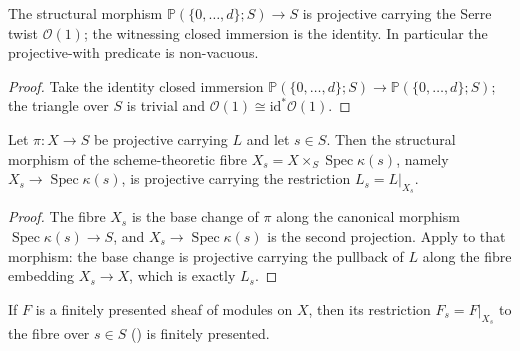 \begin{lemma}
  \label{lem:projective_space_is_projective}
  \leanok
  The structural morphism \(\mathbb{P}(\{0,\dots,d\}; S) \to S\) is projective
  carrying the Serre twist \(\mathcal{O}(1)\); the witnessing closed immersion
  is the identity.  In particular the projective-with predicate is
  non-vacuous.
\end{lemma}

\begin{proof}
  \leanok
  Take the identity closed immersion
  \(\mathbb{P}(\{0,\dots,d\}; S) \to \mathbb{P}(\{0,\dots,d\}; S)\); the
  triangle over \(S\) is trivial and \(\mathcal{O}(1) \cong
  \mathrm{id}^* \mathcal{O}(1)\).
\end{proof}

\begin{lemma}
  \label{lem:projective_with_fiber}
  \leanok
  Let \(\pi : X \to S\) be projective carrying \(L\) and let \(s \in S\).  Then
  the structural morphism of the scheme-theoretic fibre
  \(X_s = X \times_S \operatorname{Spec}\kappa(s)\), namely
  \(X_s \to \operatorname{Spec}\kappa(s)\), is projective carrying the
  restriction \(L_s = L|_{X_s}\).
\end{lemma}

\begin{proof}
  \leanok
  The fibre \(X_s\) is the base change of \(\pi\) along the canonical morphism
  \(\operatorname{Spec}\kappa(s) \to S\), and \(X_s \to
  \operatorname{Spec}\kappa(s)\) is the second projection.  Apply
   to that morphism: the base change is
  projective carrying the pullback of \(L\) along the fibre embedding
  \(X_s \to X\), which is exactly \(L_s\).
\end{proof}

\begin{lemma}
  \label{lem:fiberModule_finitePresentation}
  \leanok
  If \(F\) is a finitely presented sheaf of modules on \(X\), then its
  restriction \(F_s = F|_{X_s}\) to the fibre over \(s \in S\)
  () is finitely presented.
\end{lemma}

